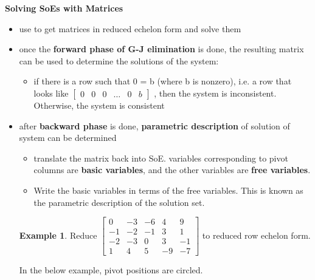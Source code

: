 \documentclass[a4paper,12pt]{article}
\theoremstyle{definition}
\theoremstyle{definition}
\newtheorem{example}{Example}[subsection]
\begin{document}
	\textbf{Solving SoEs with Matrices}
	\begin{itemize}
		\item use  to get matrices in reduced echelon form and solve them
		
		\item once the \textbf{forward phase of G-J elimination} is done, the resulting matrix can be used to determine the solutions of the system:
		\begin{itemize}
			\item if there is a row such that 0 = b (where b is nonzero), i.e. a row that looks like
			$\begin{bmatrix}
				0 & 0 & 0 & \ldots & 0 & b
			\end{bmatrix}$
			, then the system is inconsistent. Otherwise, the system is consistent
		\end{itemize}
		
		\item after \textbf{backward phase} is done, \textbf{parametric description} of solution of system can be determined
		
		\begin{itemize}
			\item translate the matrix back into SoE. variables corresponding to pivot columns are \textbf{basic variables}, and the other variables are \textbf{free variables}.
			
			\item Write the basic variables in terms of the free variables. This is known as the parametric description of the solution set.
		\end{itemize}
		
		\begin{example}
			Reduce
			$\begin{bmatrix}
				0 & -3 & -6 & 4 & 9\\
				-1 & -2 & -1 & 3 & 1\\
				-2 & -3 & 0 & 3 & -1\\
				1 & 4 & 5 & -9 & -7
			\end{bmatrix}$
			to reduced row echelon form.
			
			In the below example, pivot positions are circled.
			

\end{example}
\end{itemize}
\end{document}
